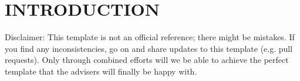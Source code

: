 \chapter*{INTRODUCTION}

Disclaimer: This template is not an official reference;
there might be mistakes.
If you find any inconsistencies, go on and share updates to this template (e.g. pull requests).
Only through combined efforts will we be able to achieve the perfect template
that the advisers will finally be happy with.


